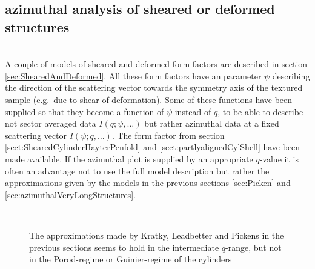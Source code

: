 \newpage
\subsection{azimuthal analysis of sheared or deformed structures} ~\\
A couple of models of sheared and deformed form factors are described in section \ref{sec:ShearedAndDeformed}. All these form factors have an parameter $\psi$ describing the direction of the scattering vector towards the symmetry axis of the textured sample (e.g.\ due to shear of deformation). Some of these functions have been supplied so that they become a function of $\psi$ instead of $q$, to be able to describe not sector averaged data $I(q;\psi,\ldots)$ but rather azimuthal data at a fixed scattering vector $I(\psi;q,\ldots)$. The form factor from section \ref{sect:ShearedCylinderHayterPenfold} and \ref{sect:partlyalignedCylShell} have been made available. If the azimuthal plot is supplied by an appropriate $q$-value it is often an advantage not to use the full model description but rather the approximations given by the models in the previous sections \ref{sec:Picken} and \ref{sec:azimuthalVeryLongStructures}.

\begin{figure}[htb]
\hfill
{} \\
\caption{The approximations made by Kratky, Leadbetter and Pickens in the previous sections seems to hold in the intermediate $q$-range, but not in the Porod-regime or Guinier-regime of the cylinders}
\label{fig:comparisionOfAzimuthalIntModels}
\end{figure}

